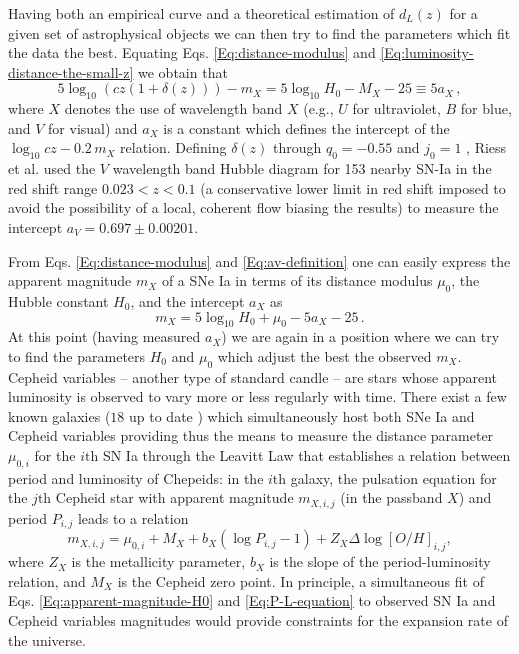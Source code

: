 Having both an empirical curve and a theoretical estimation of $d_L(z)$ for a given set of astrophysical objects we can then try to find the parameters which fit the data the best. Equating Eqs. \eqref{Eq:distance-modulus} and \eqref{Eq:luminosity-distance-the-small-z} we obtain that
\begin{equation}\label{Eq:av-definition}
5 \log_{10} ( c z ( 1+\delta(z) )) - m_X = 5 \log_{10} H_0 - M_X - 25 \equiv 5 a_X \, ,
\end{equation}
where $X$ denotes the use of wavelength band $X$ (e.g., $U$ for ultraviolet, $B$ for blue, and $V$ for visual) and $a_X$ is a constant which defines the intercept of the $\log_{10} cz - 0.2\, m_X$ relation. Defining $\delta(z)$ through $q_0 = -0.55$ and $j_0 = 1$ \cite{Riess:2006fw}, Riess et al. \cite{Riess:2011yx} used the $V$ wavelength band Hubble diagram for 153 nearby SN-Ia in the red shift range $0.023 < z < 0.1$ (a conservative lower limit in red shift imposed to avoid the possibility of a local, coherent flow biasing the results)
to measure the intercept $a_V = 0.697 \pm 0.00201$. 

From Eqs. \eqref{Eq:distance-modulus} and \eqref{Eq:av-definition} one can easily express the apparent magnitude $m_X$ of a SNe Ia in terms of its distance modulus $\mu_0$, the Hubble constant $H_0$, and the intercept $a_X$ as
\begin{equation}
m_X =  5 \log_{10} H_0 + \mu_0 - 5 a_X - 25 \, . \label{Eq:apparent-magnitude-H0}
\end{equation}
At this point (having measured $a_X$) we are again in a position where we can try to find the parameters $H_0$ and $\mu_0$ which adjust the best the observed $m_X$. Cepheid variables -- another type of standard candle -- are stars whose apparent luminosity is observed to vary more or less regularly with time. There exist a few known galaxies ($18$ up to date \cite{Riess:2016jrr}) which simultaneously host both SNe Ia and Cepheid variables providing thus the means to measure the distance parameter $\mu_{0,i}$ for the $i\mathrm{th}$ SN Ia through the Leavitt Law \cite{1912HarCi.173....1L} that establishes a relation between period and luminosity of Chepeids: in the $i\mathrm{th}$ galaxy, the pulsation equation for the $j\mathrm{th}$ Cepheid star with apparent magnitude $m_{X,i,j}$ (in the passband $X$) and period $P_{i,j}$ leads to a relation 
\begin{equation}\label{Eq:P-L-equation}
m_{X,i,j} = \mu_{0,i} + M_X + b_X (\log P_{i,j}-1) + Z_X \Delta \log[O/H]_{i,j},
\end{equation}
where $Z_X$ is the metallicity parameter, $b_X$ is the slope of the period-luminosity relation, and $M_X$ is the Cepheid zero point. In principle, a simultaneous fit of Eqs. \eqref{Eq:apparent-magnitude-H0} and \eqref{Eq:P-L-equation} to observed SN Ia and Cepheid variables magnitudes would provide constraints for the expansion rate of the universe. 

